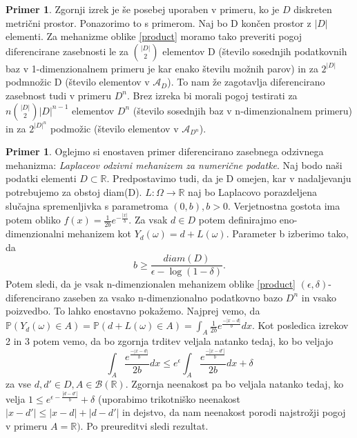 \documentclass[12pt,a4paper]{amsart}
\theoremstyle{definition} %
\newtheorem{primer}[definicija]{Primer}
\theoremstyle{plain} %
\begin{document}
\newline
\newline
\begin{primer} Zgornji izrek je še posebej uporaben v primeru, ko je $D$ diskreten metrični prostor. Ponazorimo to s primerom. Naj bo D končen prostor z $|D|$ elementi. Za mehanizme oblike \eqref{product} moramo tako preveriti pogoj diferencirane zasebnosti le za $\binom{|D|}{2}$ elementov D (število sosednjih podatkovnih baz v 1-dimenzionalnem primeru je kar enako številu možnih parov) in za $2^{|D|}$ podmnožic D (število elementov v $\mathcal{A}_D$). To nam že zagotavlja diferencirano zasebnost tudi v primeru $D^n$.  Brez izreka bi morali pogoj testirati za $n\binom{|D|}{2}|D|^{n-1}$ elementov $D^n$ (število sosednjih baz v n-dimenzionalnem primeru) in za $2^{|D|^n}$ podmožic (število elementov v $\mathcal{A}_{D^n}$).
\end{primer}
\begin{primer}  Oglejmo si enostaven primer diferencirano zasebnega odzivnega mehanizma: \textit{Laplaceov odzivni mehanizem za numerične podatke}. Naj bodo naši podatki elementi $D \subset \mathbb{R}$. Predpostavimo tudi, da je D omejen, kar v nadaljevanju potrebujemo za obstoj diam(D). $L: \Omega \rightarrow \mathbb{R}$ naj bo Laplacovo porazdeljena slučajna spremenljivka s parametroma $(0,b), b > 0$.  
Verjetnostna gostota ima potem obliko $f(x)=\frac{1}{2b}e^{-\frac{|x|}{b}}$.  Za vsak $d \in D$ potem definirajmo eno-dimenzionalni mehanizem kot  $Y_{d}(\omega) = d + L(\omega)$. Parameter b izberimo tako, da 
$$b\geq \frac{diam(D)}{\epsilon - \log(1-\delta)}.$$
Potem sledi, da je vsak n-dimenzionalen mehanizem oblike \eqref{product} $(\epsilon, \delta)$-diferencirano zaseben za vsako n-dimenzionalno podatkovno bazo $D^n$ in vsako poizvedbo. To lahko enostavno pokažemo. 
\newline
\newline
Najprej vemo, da $\mathbb{P}(Y_{d}(\omega) \in A) = \mathbb{P}(d + L(\omega) \in A) = \int_{A}\frac{1}{2b}e^{\frac{-|x-d|}{b}}dx$. Kot posledica izrekov 2 in 3 potem vemo, da bo zgornja trditev veljala natanko tedaj, ko bo veljajo 
$$\int_{A}\frac{e^{\frac{-|x-d|}{b}}}{2b}dx \leq e^{\epsilon}\int_{A}\frac{e^{\frac{-|x-d'|}{b}}}{2b}dx + \delta$$
za vse $d,d' \in D, A \in \mathcal{B}(\mathbb{R})$. Zgornja neenakost pa bo veljala natanko tedaj, ko velja $1 \leq e^{\epsilon - \frac{|d-d'|}{b}} + \delta$ (uporabimo trikotniško neenakost $|x-d'| \leq |x-d| + |d -d'|$ in dejstvo, da nam neenakost porodi najstrožji pogoj v primeru $A=\mathbb{R})$. Po preureditvi sledi rezultat. 
\end{primer}
\end{document}
